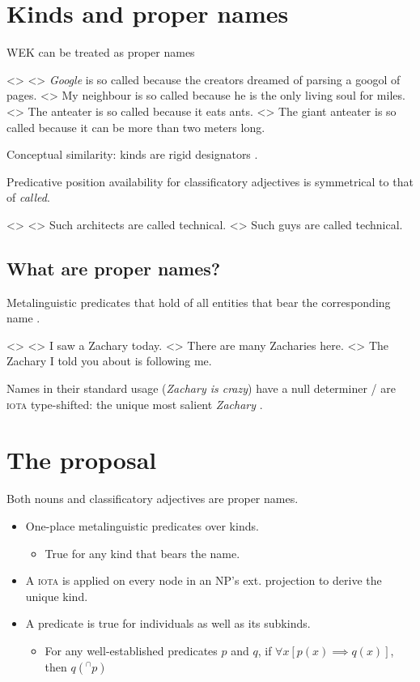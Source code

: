 \documentclass[a4paper,12pt]{article}
\begin{document}
\section{Kinds and proper names}\label{pn}

WEK can be treated as proper names \parencite{carlson1977referencekindsenglish,heyer1985genericdescriptionsdefault,krifka1995genericityintroduction}

\pex<>
    \a<> \textit{Google} is so called because the creators dreamed of parsing a googol of pages.
    \a<> \ljudge* My neighbour is so called because he is the only living soul for miles.
    \a<> The anteater is so called because it eats ants.
    \a<> The giant anteater is so called because it can be more than two meters long.
\xe

Conceptual similarity: kinds are rigid designators \parencite{krifka1995genericityintroduction}.

Predicative position availability for classificatory adjectives is symmetrical to that of \textit{called}.

\pex<>
\a<> Such architects are called technical.
\a<> \ljudge*Such guys are called technical.
\xe

\subsection{What are proper names?}

Metalinguistic predicates that hold of all entities that bear the corresponding name \textcite[a.m.o.]{burge1973referencepropernames}. 

\pex<>
    \a<> I saw a Zachary today.
    \a<> There are many Zacharies here.
    \a<> The Zachary I told you about is following me.
\xe

Names in their standard usage (\textit{Zachary is crazy}) have a null determiner / are \textsc{iota} type-shifted: the unique most salient \textit{Zachary} \parencite{elbourne2005situationsindividuals}.

\section{The proposal}

Both nouns and classificatory adjectives are proper names.

\begin{itemize}
    \item One-place metalinguistic predicates over kinds.
    \begin{itemize}
        \item True for any kind that bears the name.
    \end{itemize}
    \item A \textsc{iota} is applied on every node in an NP's ext. projection to derive the unique kind.
    \item A predicate is true for individuals as well as its subkinds.
    \begin{itemize}
        \item For any well-established predicates $p$ and $q$, if $\forall x[p(x)\implies q(x)]$, then $q(^\cap p)$
    \end{itemize}
\end{itemize}
\end{document}
